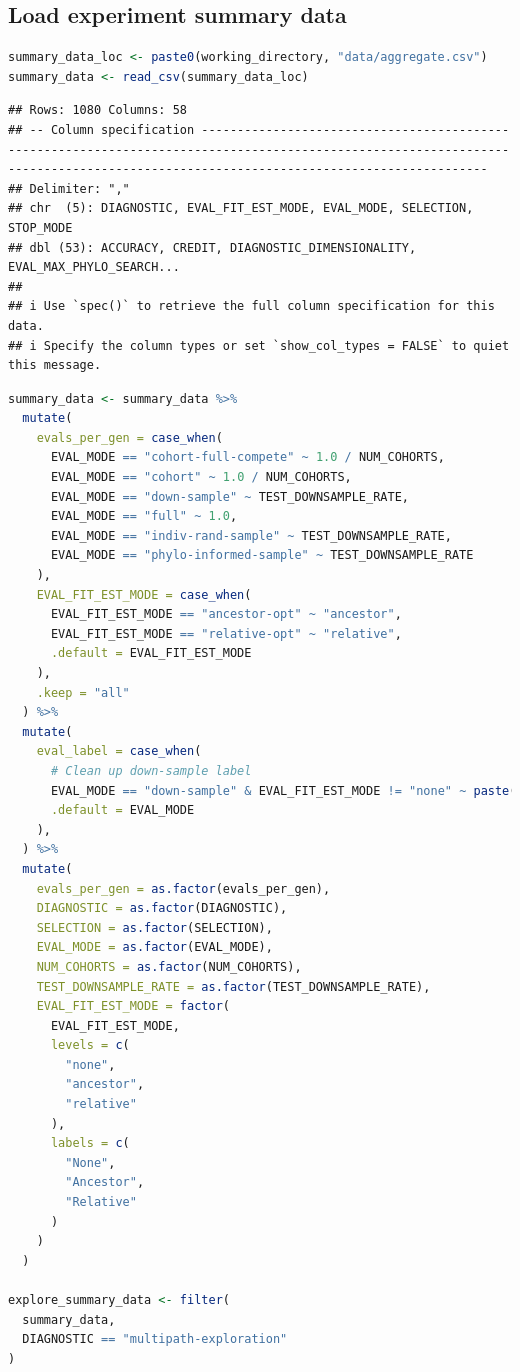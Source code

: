\documentclass[
]{book}
\begin{document}
\hypertarget{load-experiment-summary-data-2}{%
\subsection{Load experiment summary data}\label{load-experiment-summary-data-2}}

\begin{lstlisting}[language=R]
summary_data_loc <- paste0(working_directory, "data/aggregate.csv")
summary_data <- read_csv(summary_data_loc)
\end{lstlisting}

\begin{lstlisting}
## Rows: 1080 Columns: 58
## -- Column specification ------------------------------------------------------------------------------------------------------------------------------------------------------------------------------------
## Delimiter: ","
## chr  (5): DIAGNOSTIC, EVAL_FIT_EST_MODE, EVAL_MODE, SELECTION, STOP_MODE
## dbl (53): ACCURACY, CREDIT, DIAGNOSTIC_DIMENSIONALITY, EVAL_MAX_PHYLO_SEARCH...
## 
## i Use `spec()` to retrieve the full column specification for this data.
## i Specify the column types or set `show_col_types = FALSE` to quiet this message.
\end{lstlisting}

\begin{lstlisting}[language=R]
summary_data <- summary_data %>%
  mutate(
    evals_per_gen = case_when(
      EVAL_MODE == "cohort-full-compete" ~ 1.0 / NUM_COHORTS,
      EVAL_MODE == "cohort" ~ 1.0 / NUM_COHORTS,
      EVAL_MODE == "down-sample" ~ TEST_DOWNSAMPLE_RATE,
      EVAL_MODE == "full" ~ 1.0,
      EVAL_MODE == "indiv-rand-sample" ~ TEST_DOWNSAMPLE_RATE,
      EVAL_MODE == "phylo-informed-sample" ~ TEST_DOWNSAMPLE_RATE
    ),
    EVAL_FIT_EST_MODE = case_when(
      EVAL_FIT_EST_MODE == "ancestor-opt" ~ "ancestor",
      EVAL_FIT_EST_MODE == "relative-opt" ~ "relative",
      .default = EVAL_FIT_EST_MODE
    ),
    .keep = "all"
  ) %>%
  mutate(
    eval_label = case_when(
      # Clean up down-sample label
      EVAL_MODE == "down-sample" & EVAL_FIT_EST_MODE != "none" ~ paste("down-sample", EVAL_FIT_EST_MODE, sep="-"),
      .default = EVAL_MODE
    ),
  ) %>%
  mutate(
    evals_per_gen = as.factor(evals_per_gen),
    DIAGNOSTIC = as.factor(DIAGNOSTIC),
    SELECTION = as.factor(SELECTION),
    EVAL_MODE = as.factor(EVAL_MODE),
    NUM_COHORTS = as.factor(NUM_COHORTS),
    TEST_DOWNSAMPLE_RATE = as.factor(TEST_DOWNSAMPLE_RATE),
    EVAL_FIT_EST_MODE = factor(
      EVAL_FIT_EST_MODE,
      levels = c(
        "none",
        "ancestor",
        "relative"
      ),
      labels = c(
        "None",
        "Ancestor",
        "Relative"
      )
    )
  )

explore_summary_data <- filter(
  summary_data,
  DIAGNOSTIC == "multipath-exploration"
)
\end{lstlisting}
\end{document}
